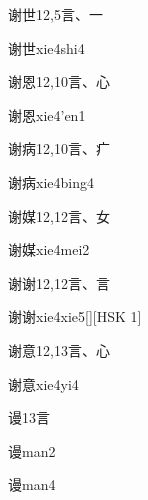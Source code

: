 \begin{entry}{谢世}{12,5}{⾔、⼀}
  \begin{phonetics}{谢世}{xie4shi4}
  \end{phonetics}
\end{entry}

\begin{entry}{谢恩}{12,10}{⾔、⼼}
  \begin{phonetics}{谢恩}{xie4'en1}
  \end{phonetics}
\end{entry}

\begin{entry}{谢病}{12,10}{⾔、⽧}
  \begin{phonetics}{谢病}{xie4bing4}
  \end{phonetics}
\end{entry}

\begin{entry}{谢媒}{12,12}{⾔、⼥}
  \begin{phonetics}{谢媒}{xie4mei2}
  \end{phonetics}
\end{entry}

\begin{entry}{谢谢}{12,12}{⾔、⾔}
  \begin{phonetics}{谢谢}{xie4xie5}[][HSK 1]
  \end{phonetics}
\end{entry}

\begin{entry}{谢意}{12,13}{⾔、⼼}
  \begin{phonetics}{谢意}{xie4yi4}
  \end{phonetics}
\end{entry}

\begin{entry}{谩}{13}{⾔}
  \begin{phonetics}{谩}{man2}
  \end{phonetics}
  \begin{phonetics}{谩}{man4}
  \end{phonetics}
\end{entry}

